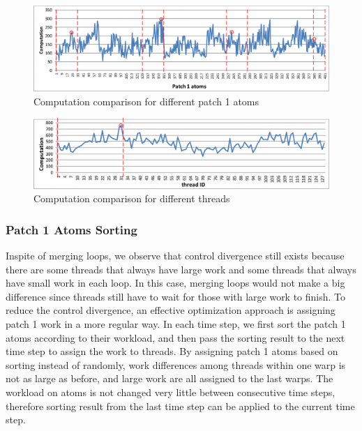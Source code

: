 \begin{figure}[h]
\centering
\setlength{\abovecaptionskip}{-1pt}
\setlength{\belowcaptionskip}{-2pt}
\includegraphics[width=6.0in]{figs/patch1_count-eps-converted-to}
\caption{Computation comparison for different patch 1 atoms}
\label{figs:patch1-count}
\vspace{-0.5cm}
\end{figure}

\begin{figure}[h]
\centering
\setlength{\abovecaptionskip}{-1pt}
\setlength{\belowcaptionskip}{-2pt}
\includegraphics[width=6.0in]{figs/thread_count-eps-converted-to}
\caption{Computation comparison for different threads}
\label{figs:thread-count}
\vspace{-0.5cm}
\end{figure}

\subsubsection{Patch 1 Atoms Sorting}

Inspite of merging loops, we observe that control divergence still exists because there are some threads that always have large work and some threads
that always have small work in each loop. In this case, merging loops would not make a big difference since threads still have to wait for those with
large work to finish. To reduce the control divergence, an effective optimization approach is assigning patch 1 work in a more regular way.
In each time step, we first sort the patch 1 atoms according to their workload, and then pass the sorting result to the next time step to assign the work to threads.
By assigning patch 1 atoms based on sorting instead of randomly, work differences among threads within one warp is not as large as before, and large work
are all assigned to the last warps. The workload on atoms is not changed very little between consecutive time steps, therefore sorting result from the last time step
can be applied to the current time step. 

